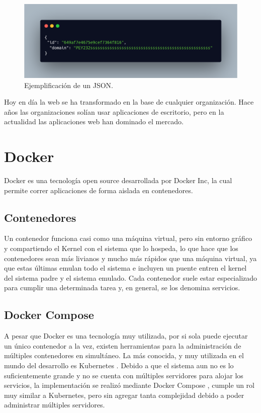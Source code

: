\begin{figure}[bth]
    \centering
    \includegraphics[width=.5\textwidth]{imgs/json-example.png}
    \caption{Ejemplificación de un JSON.}
    \label{fig:ejemplo-json}
\end{figure}

Hoy en día la web se ha transformado en la base de cualquier organización. Hace años las organizaciones solían usar aplicaciones de escritorio, pero en la actualidad las aplicaciones web han dominado el mercado.

\section{Docker}

Docker es una tecnología open source desarrollada por Docker Inc, la cual permite correr aplicaciones de forma aislada en contenedores.

\subsection{Contenedores}

Un contenedor funciona casi como una máquina virtual, pero sin entorno gráfico y compartiendo el Kernel \cite{keepcoding_que_2022} con el sistema que lo hospeda, lo que hace que los contenedores sean más livianos y mucho más rápidos que una máquina virtual, ya que estas últimas emulan todo el sistema e incluyen un puente entren el kernel del sistema padre y el sistema emulado. Cada contenedor suele estar especializado para cumplir una determinada tarea y, en general, se los denomina servicios.

\subsection{Docker Compose}

A pesar que Docker es una tecnología muy utilizada, por si sola puede ejecutar un único contenedor a la vez, existen herramientas para la administración de múltiples contenedores en simultáneo. La más conocida, y muy utilizada en el mundo del desarrollo es Kubernetes \cite{noauthor_kubernetes_nodate}.
Debido a que el sistema aun no es lo suficientemente grande y no se cuenta con múltiples servidores para alojar los servicios, la implementación se realizó mediante Docker Compose \cite{docker_inc_docker_2023}, cumple un rol muy similar a Kubernetes, pero sin agregar tanta complejidad debido a poder administrar múltiples servidores.

